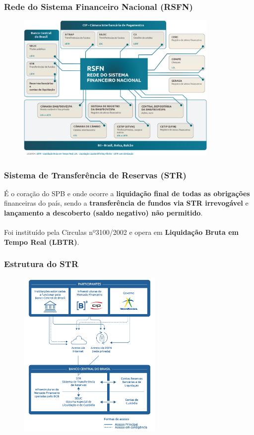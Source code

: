 \documentclass[10pt]{beamer}
\begin{document}
\begin{frame} 
\frametitle{Rede do Sistema Financeiro Nacional (RSFN)}

\begin{figure}[hbtp] %
	\centering
	\includegraphics[width=9.75cm]{RSFN.png}
\end{figure}

\end{frame}


\begin{frame} 
\frametitle{Sistema de Transferência de Reservas (STR)}

É o coração do SPB e onde ocorre a \textbf{liquidação final de todas as obrigações} financeiras do país, sendo a \textbf{transferência de fundos via STR irrevogável} e \textbf{lançamento a descoberto (saldo negativo) não permitido}.
\\~\\

Foi instituído pela Circulas nº3100/2002 e opera em \textbf{Liquidação Bruta em Tempo Real (LBTR)}.
\end{frame}

\begin{frame} 
\frametitle{Estrutura do STR}

\begin{figure}[hbtp] %
	\centering
	\includegraphics[width=7cm]{estruturaSTR.png}
\end{figure}

\end{frame}
\end{document}
